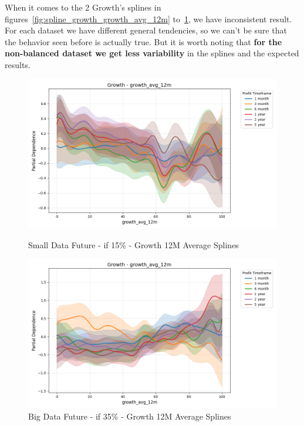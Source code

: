 \documentclass[11pt,english,a4paper,hidelinks]{book}
\begin{document}
\noindent When it comes to the 2 Growth's splines in figures~\ref{fig:spline_growth_growth_avg_12m} to~\ref{fig:spline_growth_growth_avg_12m_balanced}, we have inconsistent result. For each dataset we have different general tendencies, so we can't be sure that the behavior seen before is actually true. But it is worth noting that \textbf{for the non-balanced dataset we get less variability} in the splines and the expected results.
\begin{figure}[H]
    \centering
    \begin{minipage}{0.48\textwidth}
        \centering
        \includegraphics[width=\textwidth]{images/code/models/general_regression/splines/2D/Small Data future - IF/growth_growth_avg_12m.png}
        \caption{Small Data Future - \acrshort{if} 15\% - Growth 12M Average Splines}
        \label{fig:spline_growth_growth_avg_12m}
    \end{minipage}\hfill
    \begin{minipage}{0.48\textwidth}
        \centering
        \includegraphics[width=\textwidth]{images/code/models/general_regression/splines/2D/Big Data future - IF HARD Balanced/growth_growth_avg_12m.png}
        \caption{Big Data Future - \acrshort{if} 35\% - Growth 12M Average Splines}
        \label{fig:spline_growth_growth_avg_12m_balanced}
    \end{minipage}
\end{figure}
\end{document}
